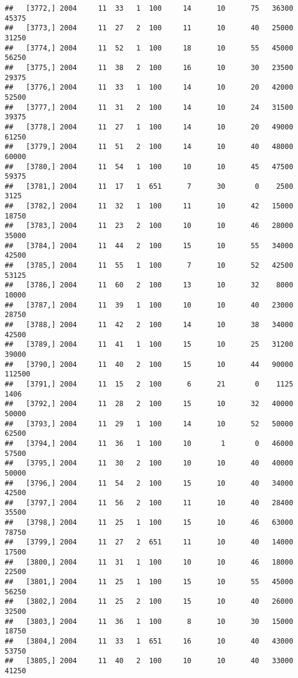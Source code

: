 \documentclass{article}\usepackage[]{graphicx}\usepackage[]{color}
\makeatletter
\newenvironment{kframe}{%
 \def\at@end@of@kframe{}%
 \ifinner\ifhmode%
  \def\at@end@of@kframe{\end{minipage}}%
  \begin{minipage}{\columnwidth}%
 \fi\fi%
 \def\FrameCommand##1{\hskip\@totalleftmargin \hskip-\fboxsep
 \colorbox{shadecolor}{##1}\hskip-\fboxsep
     \hskip-\linewidth \hskip-\@totalleftmargin \hskip\columnwidth}%
 \MakeFramed {\advance\hsize-\width
   \@totalleftmargin\z@ \linewidth\hsize
   \@setminipage}}%
 {\par\unskip\endMakeFramed%
 \at@end@of@kframe}
\newenvironment{knitrout}{}{} %
\makeatother
\begin{document}
\begin{knitrout}
\begin{kframe}
\begin{verbatim}
##   [3772,] 2004     11  33   1  100     14      10      75   36300   45375
##   [3773,] 2004     11  27   2  100     11      10      40   25000   31250
##   [3774,] 2004     11  52   1  100     18      10      55   45000   56250
##   [3775,] 2004     11  38   2  100     16      10      30   23500   29375
##   [3776,] 2004     11  33   1  100     14      10      20   42000   52500
##   [3777,] 2004     11  31   2  100     14      10      24   31500   39375
##   [3778,] 2004     11  27   1  100     14      10      20   49000   61250
##   [3779,] 2004     11  51   2  100     14      10      40   48000   60000
##   [3780,] 2004     11  54   1  100     10      10      45   47500   59375
##   [3781,] 2004     11  17   1  651      7      30       0    2500    3125
##   [3782,] 2004     11  32   1  100     11      10      42   15000   18750
##   [3783,] 2004     11  23   2  100     10      10      46   28000   35000
##   [3784,] 2004     11  44   2  100     15      10      55   34000   42500
##   [3785,] 2004     11  55   1  100      7      10      52   42500   53125
##   [3786,] 2004     11  60   2  100     13      10      32    8000   10000
##   [3787,] 2004     11  39   1  100     10      10      40   23000   28750
##   [3788,] 2004     11  42   2  100     14      10      38   34000   42500
##   [3789,] 2004     11  41   1  100     15      10      25   31200   39000
##   [3790,] 2004     11  40   2  100     15      10      44   90000  112500
##   [3791,] 2004     11  15   2  100      6      21       0    1125    1406
##   [3792,] 2004     11  28   2  100     15      10      32   40000   50000
##   [3793,] 2004     11  29   1  100     14      10      52   50000   62500
##   [3794,] 2004     11  36   1  100     10       1       0   46000   57500
##   [3795,] 2004     11  30   2  100     10      10      40   40000   50000
##   [3796,] 2004     11  54   2  100     15      10      40   34000   42500
##   [3797,] 2004     11  56   2  100     11      10      40   28400   35500
##   [3798,] 2004     11  25   1  100     15      10      46   63000   78750
##   [3799,] 2004     11  27   2  651     11      10      40   14000   17500
##   [3800,] 2004     11  31   1  100     10      10      46   18000   22500
##   [3801,] 2004     11  25   1  100     15      10      55   45000   56250
##   [3802,] 2004     11  25   2  100     15      10      40   26000   32500
##   [3803,] 2004     11  36   1  100      8      10      30   15000   18750
##   [3804,] 2004     11  33   1  651     16      10      40   43000   53750
##   [3805,] 2004     11  40   2  100     10      10      40   33000   41250

\end{verbatim}
\end{kframe}
\end{knitrout}
\end{document}
